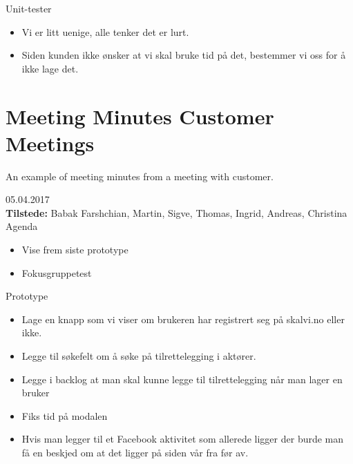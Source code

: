 {\large{Unit-tester}}
\begin{itemize}  
    \item Vi er litt uenige, alle tenker det er lurt.
    \item Siden kunden ikke ønsker at vi skal bruke tid på det, bestemmer vi oss for å ikke lage det.
\end{itemize}




\section{Meeting Minutes Customer Meetings}
\label{meeting_minutes_customer_meetings}

An example of meeting minutes from a meeting with customer.

{\huge{05.04.2017}}\\
\textbf{Tilstede:} Babak Farshchian, Martin, Sigve, Thomas, Ingrid, Andreas, Christina\\

{\Large{Agenda}}
\begin{itemize} 
    \item Vise frem siste prototype
    \item Fokusgruppetest
\end{itemize} 


{\large{Prototype}}
\begin{itemize}  
    \item Lage en knapp som vi viser om brukeren har registrert seg på skalvi.no eller ikke.
    \item Legge til søkefelt om å søke på tilrettelegging i aktører.
    \item Legge i backlog at man skal kunne legge til tilrettelegging når man lager en bruker
    \item Fiks tid på modalen
    \item Hvis man legger til et Facebook aktivitet som allerede ligger der burde man få en beskjed om at det ligger på siden vår fra før av.
\end{itemize}

